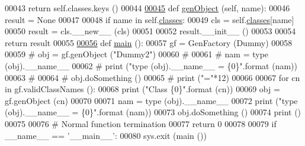 \begin{DoxyCode}
00043         \textcolor{keywordflow}{return} self.classes.keys ()
00044     
\hypertarget{gen__factory_8py_source.tex_l00045}{}\hyperlink{classgen__factory_1_1_gen_factory_aeb00856af2fa15d7973be43678779561}{00045}     \textcolor{keyword}{def }\hyperlink{classgen__factory_1_1_gen_factory_aeb00856af2fa15d7973be43678779561}{genObject} (self, name):
00046         result = \textcolor{keywordtype}{None} 
00047         
00048         \textcolor{keywordflow}{if} name \textcolor{keywordflow}{in} self.\hyperlink{classgen__factory_1_1_gen_factory_a28f3142219cbe573169e5f90508908b3}{classes}:
00049                 cls = self.\hyperlink{classgen__factory_1_1_gen_factory_a28f3142219cbe573169e5f90508908b3}{classes}[name]
00050                 result = cls.\_\_new\_\_ (cls)
00051                 
00052                 result.\_\_init\_\_ ()
00053                 
00054         \textcolor{keywordflow}{return} result
00055         
\hypertarget{gen__factory_8py_source.tex_l00056}{}\hyperlink{namespacegen__factory_a785bd40533dd477ffff224d65ba1c5c3}{00056} \textcolor{keyword}{def }\hyperlink{namespacegen__factory_a785bd40533dd477ffff224d65ba1c5c3}{main} ():
00057     gf = GenFactory (Dummy)
00058     
00059 \textcolor{comment}{#    obj = gf.genObject ("Dummy2")}
00060 \textcolor{comment}{#    }
00061 \textcolor{comment}{#    nam = type (obj).\_\_name\_\_ }
00062 \textcolor{comment}{#    print ("type (obj).\_\_name\_\_ = \{0\}".format (nam))}
00063 \textcolor{comment}{#    }
00064 \textcolor{comment}{#    obj.doSomething ()}
00065 \textcolor{comment}{#    print ("="*12)}
00066     
00067     \textcolor{keywordflow}{for} cn \textcolor{keywordflow}{in} gf.validClassNames ():
00068         \textcolor{keywordflow}{print} (\textcolor{stringliteral}{"Class \{0\}"}.format (cn))
00069         obj = gf.genObject (cn)
00070     
00071         nam = type (obj).\_\_name\_\_ 
00072         \textcolor{keywordflow}{print} (\textcolor{stringliteral}{"type (obj).\_\_name\_\_ = \{0\}"}.format (nam))
00073         obj.doSomething ()
00074         \textcolor{keywordflow}{print} ()
00075         
00076     \textcolor{comment}{# Normal function termination}
00077     \textcolor{keywordflow}{return} 0
00078 
00079 \textcolor{keywordflow}{if} \_\_name\_\_ == \textcolor{stringliteral}{'\_\_main\_\_'}:
00080     sys.exit (main ())
\end{DoxyCode}
